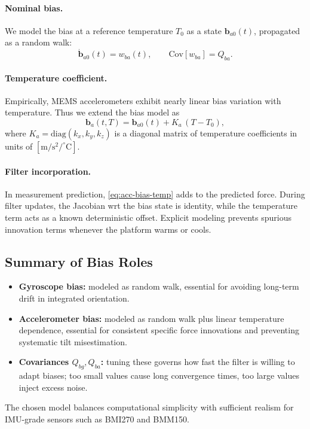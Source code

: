 \documentclass[10pt]{extarticle}
\begin{document}
\paragraph{Nominal bias.}
We model the bias at a reference temperature $T_0$ as a state $\bm b_{a0}(t)$,
propagated as a random walk:
\begin{equation}
\dot{\bm b}_{a0}(t) = w_{ba}(t),\qquad
\mathrm{Cov}[w_{ba}] = Q_{ba}.
\label{eq:acc-bias-base}
\end{equation}

\paragraph{Temperature coefficient.}
Empirically, MEMS accelerometers exhibit nearly linear bias variation with temperature.
Thus we extend the bias model as
\begin{equation}
\bm b_a(t,T) = \bm b_{a0}(t) + K_a\,(T-T_0),
\label{eq:acc-bias-temp}
\end{equation}
where $K_a=\mathrm{diag}(k_x,k_y,k_z)$ is a diagonal matrix of temperature coefficients
in units of $[\mathrm{m/s^2}/^\circ\mathrm{C}]$.

\paragraph{Filter incorporation.}
In measurement prediction, \eqref{eq:acc-bias-temp} adds to the predicted force. During
filter updates, the Jacobian wrt the bias state is identity, while the temperature term
acts as a known deterministic offset. Explicit modeling prevents spurious innovation
terms whenever the platform warms or cools.

\subsection{Summary of Bias Roles}
\begin{itemize}
\item \textbf{Gyroscope bias:} modeled as random walk, essential for avoiding long-term
drift in integrated orientation.
\item \textbf{Accelerometer bias:} modeled as random walk plus linear temperature
dependence, essential for consistent specific force innovations and preventing systematic
tilt misestimation.
\item \textbf{Covariances $Q_{bg},Q_{ba}$:} tuning these governs how fast the filter
is willing to adapt biases; too small values cause long convergence times, too large values
inject excess noise.
\end{itemize}
The chosen model balances computational simplicity with sufficient realism for IMU-grade
sensors such as BMI270 and BMM150.
\end{document}
